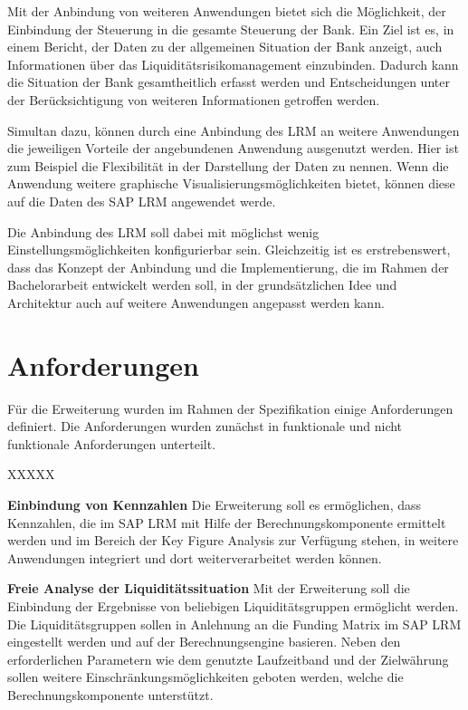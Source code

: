 Mit der Anbindung von weiteren Anwendungen bietet sich die Möglichkeit, der Einbindung der Steuerung in die gesamte Steuerung der Bank. Ein Ziel ist es, in einem Bericht, der Daten zu der allgemeinen Situation der Bank anzeigt, auch Informationen über das Liquiditätsrisikomanagement einzubinden. Dadurch kann die Situation der Bank gesamtheitlich erfasst werden und Entscheidungen unter der Berücksichtigung von weiteren Informationen getroffen werden.

Simultan dazu, können durch eine Anbindung des LRM an weitere Anwendungen die jeweiligen Vorteile der angebundenen Anwendung ausgenutzt werden. Hier ist zum Beispiel die Flexibilität in der Darstellung der Daten zu nennen. Wenn die Anwendung weitere graphische Visualisierungsmöglichkeiten bietet, können diese auf die Daten des SAP LRM angewendet werde.

Die Anbindung des LRM soll dabei mit möglichst wenig Einstellungsmöglichkeiten konfigurierbar sein. Gleichzeitig ist es erstrebenswert, dass das Konzept der Anbindung und die Implementierung, die im Rahmen der Bachelorarbeit entwickelt werden soll, in der grundsätzlichen Idee und Architektur auch auf weitere Anwendungen angepasst werden kann.

\section{Anforderungen}

Für die Erweiterung wurden im Rahmen der Spezifikation einige Anforderungen definiert. Die Anforderungen wurden zunächst in funktionale und nicht funktionale Anforderungen unterteilt. 

\begin{seToplist}{ XXXXX }

\item[\anfl{kpi}] \textbf{Einbindung von Kennzahlen} \newline
Die Erweiterung soll es ermöglichen, dass Kennzahlen, die im SAP LRM  mit Hilfe der Berechnungskomponente ermittelt werden und im Bereich der Key Figure Analysis zur Verfügung stehen, in weitere Anwendungen integriert und dort weiterverarbeitet werden können.

\item[\anfl{fundingMatrix}] \textbf{Freie Analyse der Liquiditätssituation} \newline
Mit der Erweiterung soll die Einbindung der Ergebnisse von beliebigen Liquiditätsgruppen ermöglicht werden. Die Liquiditätsgruppen sollen in Anlehnung an die Funding Matrix im SAP LRM eingestellt werden und auf der Berechnungsengine basieren. Neben den erforderlichen Parametern wie dem genutzte Laufzeitband und der Zielwährung sollen weitere Einschränkungsmöglichkeiten geboten werden, welche die Berechnungskomponente unterstützt.

\end{seToplist}

